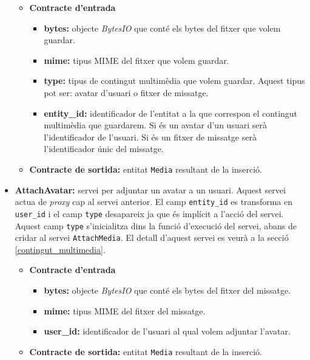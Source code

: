 \begin{itemize}
				\begin{itemize}
					\item \textbf{Contracte d'entrada}
						\begin{itemize}
							\item \textbf{bytes:} objecte \emph{BytesIO} que conté els bytes del fitxer que volem guardar.
							\item \textbf{mime:} tipus \ac{MIME} del fitxer que volem guardar.
							\item \textbf{type:} tipus de contingut multimèdia que volem guardar. Aquest tipus pot ser: avatar d'usuari o fitxer de missatge.
							\item \textbf{entity\_id:} identificador de l'entitat a la que correspon el contingut multimèdia que guardarem. Si és un avatar d'un usuari serà l'identificador de l'usuari. Si és un fitxer de missatge serà l'identificador únic del missatge.
						\end{itemize}
					\item \textbf{Contracte de sortida:} entitat \texttt{Media} resultant de la inserció.
				\end{itemize}
				
			\item \textbf{AttachAvatar:} servei per adjuntar un avatar a un usuari. Aquest servei actua de \emph{proxy} cap al servei anterior. El camp \texttt{entity\_id} es transforma en \texttt{user\_id} i el camp \texttt{type} desapareix ja que és implícit a l'acció del servei. Aquest camp \texttt{type} s'inicialitza dins la funció d'execució del servei, abans de cridar al servei \texttt{AttachMedia}.  El detall d'aquest servei es veurà a la secció \ref{contingut_multimedia}.
			
			\begin{itemize}
					\item \textbf{Contracte d'entrada}
						\begin{itemize}
							\item \textbf{bytes:} objecte \emph{BytesIO} que conté els bytes del fitxer del missatge.
							\item \textbf{mime:} tipus \ac{MIME} del fitxer del missatge.
							\item \textbf{user\_id:} identificador de l'usuari al qual volem adjuntar l'avatar.
						\end{itemize}
					\item \textbf{Contracte de sortida:} entitat \texttt{Media} resultant de la inserció.
				\end{itemize}
				

\end{itemize}
